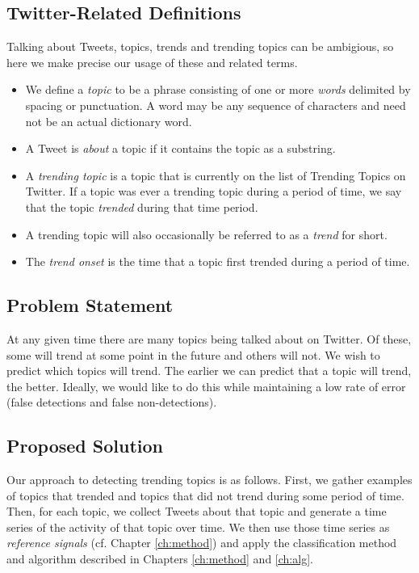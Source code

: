 \subsection{Twitter-Related Definitions}
Talking about Tweets, topics, trends and trending topics can be ambigious, so
here we make precise our usage of these and related terms.
\begin{itemize}
\item We define a {\em topic} to be a phrase consisting of one or more {\em
  words} delimited by spacing or punctuation. A word may be any sequence of
  characters and need not be an actual dictionary word.
\item A Tweet is {\em about} a topic if it contains the topic as a substring.
\item A {\em trending topic} is a topic that is currently on the list of
  Trending Topics on Twitter. If a topic was ever a trending topic during a
  period of time, we say that the topic {\em trended} during that time period.
\item A trending topic will also occasionally be referred to as a {\em trend}
  for short.
\item The {\em trend onset} is the time that a topic first trended during a
  period of time.
\end{itemize}

\subsection{Problem Statement}
At any given time there are many topics being talked about on Twitter. Of these,
some will trend at some point in the future and others will not. We wish to
predict which topics will trend. The earlier we can predict that a topic will
trend, the better. Ideally, we would like to do this while maintaining a low
rate of error (false detections and false non-detections).

\subsection{Proposed Solution}
Our approach to detecting trending topics is as follows. First, we gather
examples of topics that trended and topics that did not trend during
some period of time. Then, for each topic, we collect Tweets about that topic
and generate a time series of the activity of that topic over time. We then use
those time series as {\em reference signals} (cf. Chapter \ref{ch:method}) and
apply the classification method and algorithm described in Chapters
\ref{ch:method} and \ref{ch:alg}.

